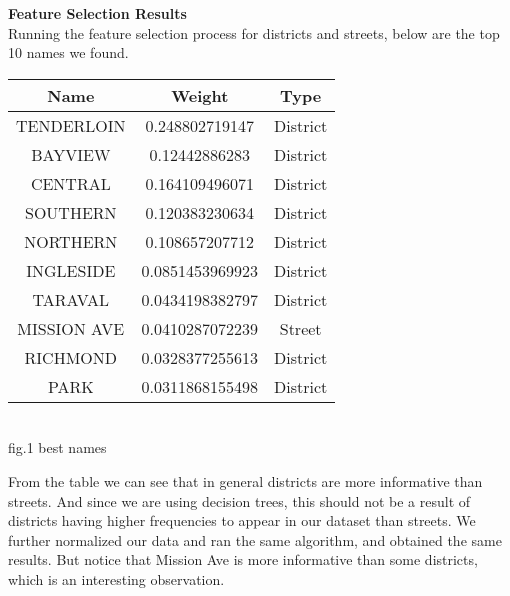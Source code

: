 \documentclass[12pt]{article}
\newenvironment{p4}[2][Results and Evaluation]{\begin{trivlist}
\item[\hskip \labelsep {\bfseries #1}\hskip \labelsep {\bfseries #2}]}{\end{trivlist}}
\begin{document}
\begin{p4}{}
\item{\textbf{Feature Selection Results}\\}
Running the feature selection process for districts and streets, below are the top 10 names we found.
\begin{center}
	\begin{tabular}{||c c c||} 
		\hline
	   	Name & Weight & Type\\
		\hline
		TENDERLOIN & 0.248802719147 & District\\
		\hline
		BAYVIEW  & 0.12442886283 & District\\
		\hline
		CENTRAL  & 0.164109496071 & District\\
		\hline
		SOUTHERN & 0.120383230634 & District\\
		\hline
		NORTHERN & 0.108657207712 & District\\
		\hline
		INGLESIDE & 0.0851453969923 & District\\
		\hline
		TARAVAL & 0.0434198382797 & District\\
		\hline
		MISSION AVE & 0.0410287072239 & Street\\
		\hline
		RICHMOND & 0.0328377255613 & District\\
		\hline
		PARK & 0.0311868155498 & District\\
		\hline
	\end{tabular}
	{\\fig.1 best names}
\end{center}
From the table we can see that in general districts are more informative than streets. And since we are using decision trees, this should not be a result of districts having higher frequencies to appear in our dataset than streets. We further normalized our data and ran the same algorithm, and obtained the same results. But notice that Mission Ave is more informative than some districts, which is an interesting observation.
\end{p4}

 
\end{document}
